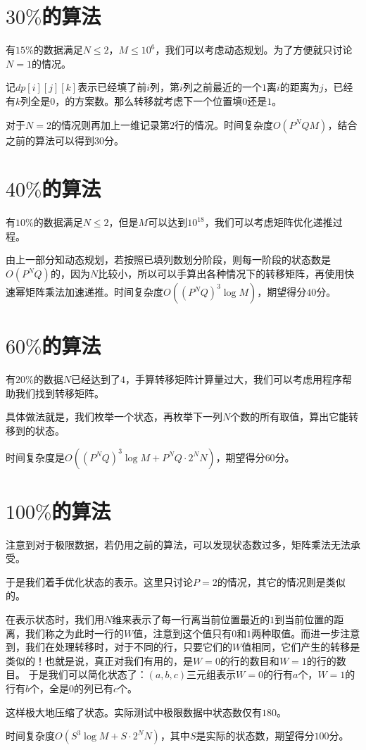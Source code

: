 \documentclass[a4paper]{article}
\begin{document}
\section{$30\%$的算法}
有$15\%$的数据满足$N \le 2$，$M \le 10^6$，我们可以考虑动态规划。为了方便就只讨论$N=1$的情况。 \par
记$dp[i][j][k]$表示已经填了前$i$列，第$i$列之前最近的一个$1$离$i$的距离为$j$，已经有$k$列全是$0$，的方案数。那么转移就考虑下一个位置填$0$还是$1$。 \par
对于$N=2$的情况则再加上一维记录第$2$行的情况。时间复杂度$O(P^NQM)$，结合之前的算法可以得到$30$分。

\section{$40\%$的算法}
有$10\%$的数据满足$N \le 2$，但是$M$可以达到$10^{18}$，我们可以考虑矩阵优化递推过程。 \par
由上一部分知动态规划，若按照已填列数划分阶段，则每一阶段的状态数是$O(P^NQ)$的，因为$N$比较小，所以可以手算出各种情况下的转移矩阵，再使用快速幂矩阵乘法加速递推。时间复杂度$O((P^NQ)^3\log{M})$，期望得分$40$分。

\section{$60\%$的算法}
有$20\%$的数据$N$已经达到了$4$，手算转移矩阵计算量过大，我们可以考虑用程序帮助我们找到转移矩阵。 \par
具体做法就是，我们枚举一个状态，再枚举下一列$N$个数的所有取值，算出它能转移到的状态。 \par
时间复杂度是$O((P^NQ)^3\log{M} + P^NQ \cdot 2^NN)$，期望得分$60$分。

\section{$100\%$的算法}
注意到对于极限数据，若仍用之前的算法，可以发现状态数过多，矩阵乘法无法承受。 \par
于是我们着手优化状态的表示。这里只讨论$P=2$的情况，其它的情况则是类似的。 \par
在表示状态时，我们用$N$维来表示了每一行离当前位置最近的$1$到当前位置的距离，我们称之为此时一行的$W$值，注意到这个值只有$0$和$1$两种取值。而进一步注意到，我们在处理转移时，对于不同的行，只要它们的$W$值相同，它们产生的转移是类似的！也就是说，真正对我们有用的，是$W=0$的行的数目和$W=1$的行的数目。
于是我们可以简化状态了：$(a,b,c)$三元组表示$W=0$的行有$a$个，$W=1$的行有$b$个，全是$0$的列已有$c$个。 \par
这样极大地压缩了状态。实际测试中极限数据中状态数仅有$180$。 \par
时间复杂度$O(S^3\log{M} + S \cdot 2^NN)$，其中$S$是实际的状态数，期望得分$100$分。
\end{document}
